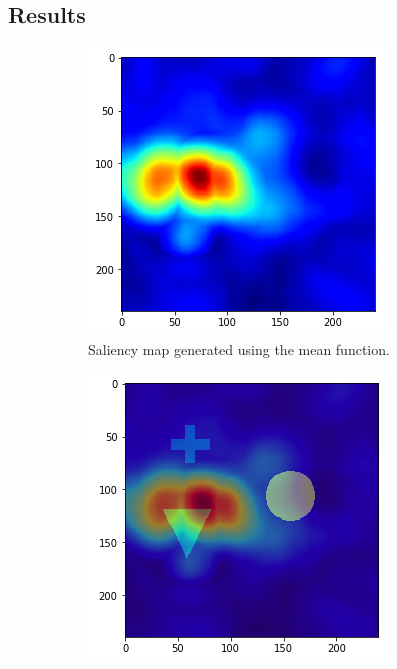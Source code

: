\subsection{Results}
\begin{figure}[H]
    \centering
    \begin{subfigure}{.5\textwidth}
        \centering
        \includegraphics[width=\linewidth]{chapters/05_testnet/images/rise_1-0.png}
        \caption{Saliency map generated using the mean function.}
    \end{subfigure}%
    \begin{subfigure}{.5\textwidth}
        \centering
        \includegraphics[width=\linewidth]{chapters/05_testnet/images/rise_1-1.png}

\end{subfigure}
\end{figure}
